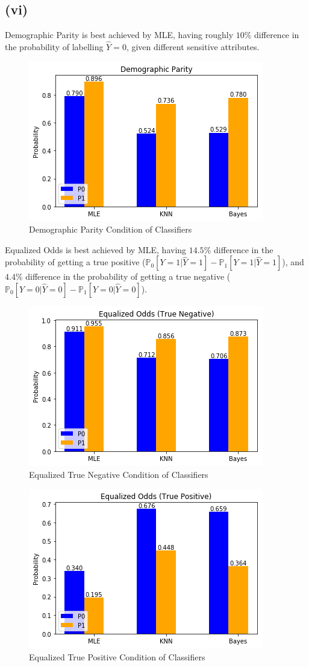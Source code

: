 \documentclass[twoside,11pt]{homework}
\begin{document}
\subsection*{(vi)}
	Demographic Parity is best achieved by MLE, having roughly $10\%$ difference in the probability of labelling $\hat{Y}=0$, 
	given different sensitive attributes.  
	\begin{figure}[H]
		\centering
		\includegraphics[scale=.5]{q5_fig/dp.png}	
		\caption{Demographic Parity Condition of Classifiers}
	\end{figure}
	Equalized Odds is best achieved by MLE, having $14.5\%$ difference in the probability of getting a true positive
	($\mathbb{P}_0[Y=1|\hat{Y}=1]-\mathbb{P}_1[Y=1|\hat{Y}=1]$),
	and $4.4\%$ difference in the probability of getting a true negative ($\mathbb{P}_0[Y=0|\hat{Y}=0]-\mathbb{P}_1[Y=0|\hat{Y}=0]$).
	\begin{figure}[H]
		\centering
		\includegraphics[scale=.5]{q5_fig/eo_neg.png}	
		\caption{Equalized True Negative Condition of Classifiers}
	\end{figure}
	\begin{figure}[H]
		\centering
		\includegraphics[scale=.5]{q5_fig/eo_pos.png}	
		\caption{Equalized True Positive Condition of Classifiers}
	\end{figure}
\end{document}
